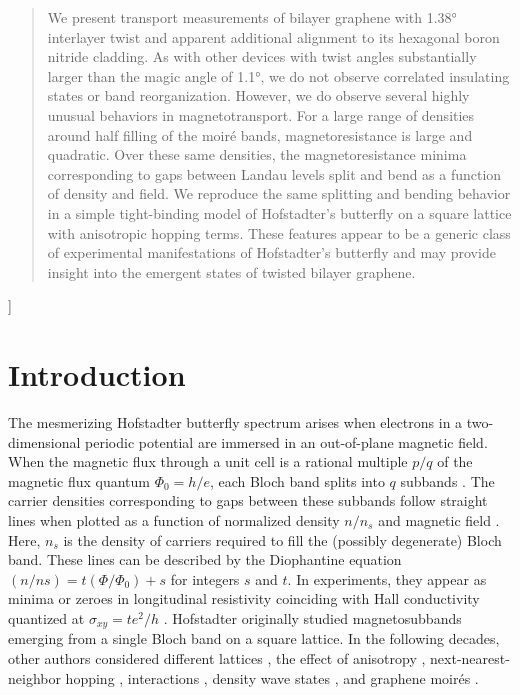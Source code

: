 \documentclass[12pt,twocolumn]{article}
\begin{document}
{\begin{abstract}
We present transport measurements of bilayer graphene with 1.38° interlayer twist and apparent additional alignment to its hexagonal boron nitride cladding. As with other devices with twist angles substantially larger than the magic angle of 1.1°, we do not observe correlated insulating states or band reorganization. However, we do observe several highly unusual behaviors in magnetotransport. For a large range of densities around half filling of the moiré bands, magnetoresistance is large and quadratic. Over these same densities, the magnetoresistance minima corresponding to gaps between Landau levels split and bend as a function of density and field. We reproduce the same splitting and bending behavior in a simple tight-binding model of Hofstadter’s butterfly on a square lattice with anisotropic hopping terms. These features appear to be a generic class of experimental manifestations of Hofstadter’s butterfly and may provide insight into the emergent states of twisted bilayer graphene.
\end{abstract}
}]


\section{Introduction}
\noindent The mesmerizing Hofstadter butterfly spectrum arises when electrons in a two-dimensional periodic potential are immersed in an out-of-plane magnetic field. When the magnetic flux through a unit cell is a rational multiple $p/q$ of the magnetic flux quantum $\Phi_0=h/e$, each Bloch band splits into $q$ subbands \cite{hofstadterEnergyLevelsWave1976}. The carrier densities corresponding to gaps between these subbands follow straight lines when plotted as a function of normalized density $n/n_s$ and magnetic field \cite{wannierResultNotDependent1978}. Here, $n_s$ is the density of carriers required to fill the (possibly degenerate) Bloch band. These lines can be described by the Diophantine equation $(n/ns)=t(\Phi/\Phi_0)+s$ for integers $s$ and $t$. In experiments, they appear as minima or zeroes in longitudinal resistivity coinciding with Hall conductivity quantized at $\sigma_{xy}=te^2/h$ \cite{stredaQuantisedHallEffect1982,thoulessQuantizedHallConductance1982}. Hofstadter originally studied magnetosubbands emerging from a single Bloch band on a square lattice. In the following decades, other authors considered different lattices \cite{claroMagneticSubbandStructure1979,hasegawaStabilizationFluxStates1990,liTightbindingElectronsTriangular2011}, the effect of anisotropy \cite{barelliMagneticFieldInducedDirectionalLocalization1999,hasegawaStabilizationFluxStates1990,powellDensityWaveStates2019,sunPossibilityQuenchingIntegerquantumHall1991}, next-nearest-neighbor hopping \cite{claroSpectrumTightBinding1981,gvozdikovEnergySpectrumBloch1994,hanCriticalBicriticalProperties1994,hatsugaiEnergySpectrumQuantum1990,ohEnergySpectrumTriangular2000}, interactions \cite{barelliTwoInteractingHofstadter1997,mishraEffectsInteractionHofstadter2016}, density wave states \cite{powellDensityWaveStates2019}, and graphene moirés \cite{bistritzerMoirButterfliesTwisted2011,moonEnergySpectrumQuantum2012}.
\end{document}
